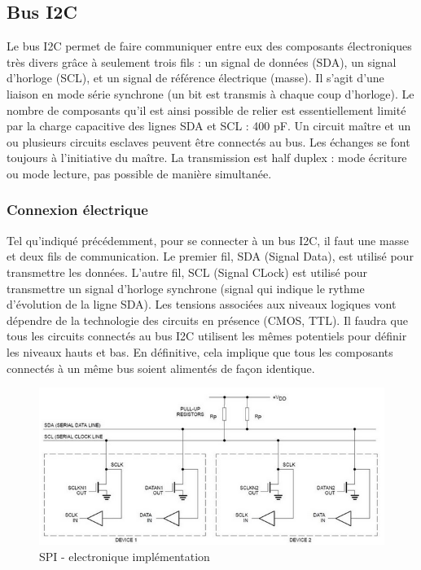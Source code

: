 \documentclass[french,a4paper,12pt]{report}
\begin{document}
 
 			\subsection{Bus I2C}
 			
 			Le bus I2C permet de faire communiquer entre eux des composants électroniques très divers grâce à seulement trois fils : un signal de données (SDA), un signal d'horloge (SCL), et un signal de référence électrique (masse).
Il s'agit d'une liaison en mode série synchrone (un bit est transmis à chaque coup d’horloge). Le nombre de composants qu'il est ainsi possible de relier est essentiellement limité par la charge capacitive des lignes SDA et SCL : 400 pF.
Un circuit maître et un ou plusieurs circuits esclaves peuvent être connectés au bus. Les échanges se font toujours à l’initiative du maître. La transmission est half duplex : mode écriture ou mode lecture, pas possible de manière simultanée.
 
  		\subsubsection{Connexion électrique}
  		
  		Tel qu'indiqué précédemment, pour se connecter à un bus I2C, il faut une masse et deux fils de communication. Le premier fil, SDA (Signal Data), est utilisé pour transmettre les données. L'autre fil, SCL (Signal CLock) est utilisé pour transmettre un signal d'horloge synchrone (signal qui indique le rythme d'évolution de la ligne SDA). Les tensions associées aux niveaux logiques vont dépendre de la technologie des circuits en présence (CMOS, TTL). Il faudra que tous les circuits connectés au bus I2C utilisent les mêmes potentiels pour définir les niveaux hauts et bas. En définitive, cela implique que tous les composants connectés à un même bus soient alimentés de façon identique.
  		
  \begin{figure}[!ht]
    \center
  	\includegraphics[width=12cm]{SPI5.png}
    \caption{SPI - electronique implémentation}
	\end{figure}
 
\end{document}
